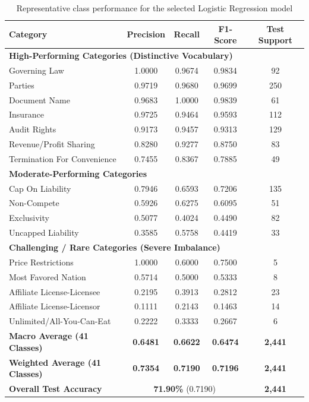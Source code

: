\begin{table}[h!]
\centering
\small
\begin{tabular}{lcccc}
\toprule
\textbf{Category} & \textbf{Precision} & \textbf{Recall} & \textbf{F1-Score} & \textbf{Test Support} \\
\midrule
\multicolumn{5}{l}{\textbf{High-Performing Categories (Distinctive Vocabulary)}} \\
Governing Law              & 1.0000 & 0.9674 & 0.9834 & 92  \\
Parties                    & 0.9719 & 0.9680 & 0.9699 & 250 \\
Document Name              & 0.9683 & 1.0000 & 0.9839 & 61  \\
Insurance                  & 0.9725 & 0.9464 & 0.9593 & 112 \\
Audit Rights               & 0.9173 & 0.9457 & 0.9313 & 129 \\
Revenue/Profit Sharing     & 0.8280 & 0.9277 & 0.8750 & 83  \\
Termination For Convenience& 0.7455 & 0.8367 & 0.7885 & 49  \\
\midrule
\multicolumn{5}{l}{\textbf{Moderate-Performing Categories}} \\
Cap On Liability           & 0.7946 & 0.6593 & 0.7206 & 135 \\
Non-Compete                & 0.5926 & 0.6275 & 0.6095 & 51  \\
Exclusivity                & 0.5077 & 0.4024 & 0.4490 & 82  \\
Uncapped Liability         & 0.3585 & 0.5758 & 0.4419 & 33  \\
\midrule
\multicolumn{5}{l}{\textbf{Challenging / Rare Categories (Severe Imbalance)}} \\
Price Restrictions         & 1.0000 & 0.6000 & 0.7500 & 5   \\
Most Favored Nation        & 0.5714 & 0.5000 & 0.5333 & 8   \\
Affiliate License-Licensee & 0.2195 & 0.3913 & 0.2812 & 23  \\
Affiliate License-Licensor & 0.1111 & 0.2143 & 0.1463 & 14  \\
Unlimited/All-You-Can-Eat  & 0.2222 & 0.3333 & 0.2667 & 6   \\
\midrule
\textbf{Macro Average (41 Classes)}    & \textbf{0.6481} & \textbf{0.6622} & \textbf{0.6474} & \textbf{2,441} \\
\textbf{Weighted Average (41 Classes)} & \textbf{0.7354} & \textbf{0.7190} & \textbf{0.7196} & \textbf{2,441} \\
\textbf{Overall Test Accuracy}         & \multicolumn{3}{c}{\textbf{71.90\%} (0.7190)} & \textbf{2,441} \\
\bottomrule
\end{tabular}
\caption{Representative class performance for the selected Logistic Regression model}
\label{tab:representative_classes}
\end{table}

